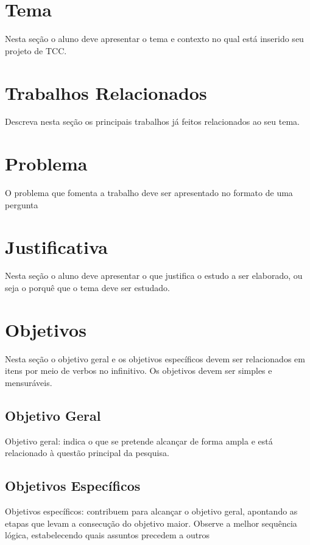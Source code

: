 \documentclass[a4paper,12pt]{article}
\begin{document}


\newpage
\tableofcontents

\newpage
\section{Tema}
Nesta seção o aluno deve apresentar o tema e contexto no qual está inserido seu projeto de TCC.


\section{Trabalhos Relacionados}
Descreva nesta seção os principais trabalhos já feitos relacionados ao seu tema.


\section{Problema}
O problema que fomenta a trabalho deve ser apresentado no formato de uma pergunta


\section{Justificativa}
Nesta seção o aluno deve apresentar o que justifica o estudo a ser elaborado, ou seja o porquê que o tema deve ser estudado.

\section{Objetivos}
\label{sc:objetivos}
Nesta seção o objetivo geral e os objetivos específicos devem ser relacionados em itens por meio de verbos no infinitivo. Os objetivos devem ser simples e mensuráveis.

\subsection{Objetivo Geral}
Objetivo geral: indica o que se pretende alcançar de forma ampla e está relacionado à questão principal da pesquisa.

\subsection{Objetivos Específicos}
Objetivos específicos: contribuem para alcançar o objetivo geral, apontando as etapas que levam a consecução do objetivo maior. Observe a melhor sequência lógica, estabelecendo quais assuntos precedem a outros
\end{document}
